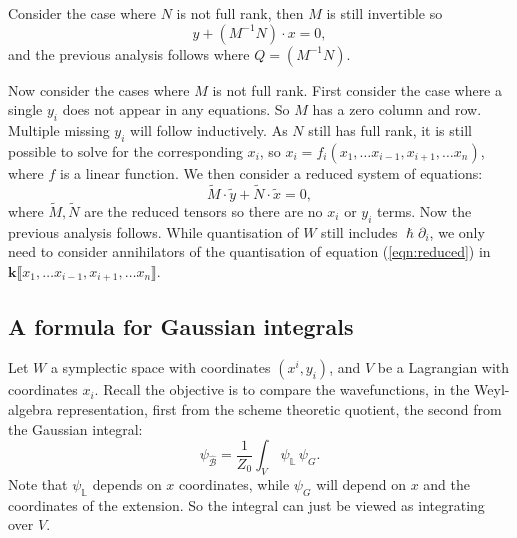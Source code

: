     Consider the case where \(N\) is not full rank, then \(M\) is still invertible so
    \[ y + (M^{-1} N) \cdot x = 0,\]
    and the previous analysis follows where \( Q = (M^{-1} N)\). 
    
    Now consider the cases where \(M\) is not full rank. First consider the case where a single \(y_i\) does not appear in any equations. So \(M\) has a zero column and row. Multiple missing \(y_i\) will follow inductively. As \(N\) still has full rank, it is still possible to solve for the corresponding \(x_i\), so \(x_i = f_i(x_1, \dots x_{i-1}, x_{i+1}, \dots x_n)\), where \(f\) is a linear function. We then consider a reduced system of equations:
    \begin{equation} \label{eqn:reduced} \widetilde{M}\cdot \widetilde{y} + \widetilde{N} \cdot \widetilde{x} = 0,\end{equation}
    where \(\widetilde{M}, \widetilde{N} \) are the reduced tensors so there are no \(x_i\) or \(y_i\) terms. Now the previous analysis follows.  While quantisation of \(W\) still includes \( \hslash \partial_i \), we only need to consider annihilators of the quantisation of equation (\ref{eqn:reduced}) in \( \mathbf{k} \lBrack x_1, \dots x_{i-1}, x_{i+1}, \dots x_n\rBrack\).

    
    \subsection{A formula for Gaussian integrals}

    Let \(W\) a symplectic space with coordinates \( (x^i,y_i)\), and \(V\) be a Lagrangian with coordinates \(x_i\). Recall the objective is to compare the wavefunctions, in the Weyl-algebra representation, first from the scheme theoretic quotient, the second from the Gaussian integral:
    \begin{equation} 
    \label{eq:gaussint}
    \psi_{\widehat{\mathcal{B}}} = \frac{1}{Z_0} \int_{V} \,  \psi_{\mathbb{L}} \, \psi_G  . 
    \end{equation}
    Note that \( \psi_{\mathbb{L}} \) depends on \(x\) coordinates, while \( \psi_G\) will depend on \(x\) and the coordinates of the extension. So the integral can just be viewed as integrating over \(V\).
    
    
    
